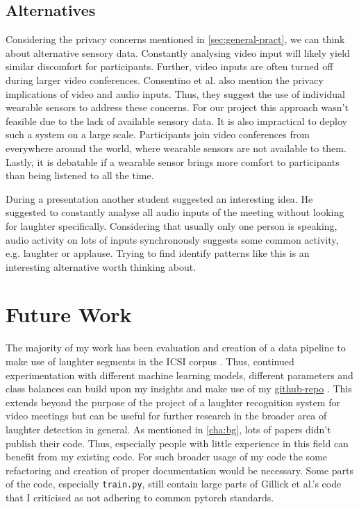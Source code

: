 \documentclass[bsc,frontabs,parskip,deptreport]{infthesis}
\newcommand{\coderepo}{\href{https://github.com/LasseWolter/laughter-detection-icsi}{github-repo} }
\begin{document}
\section{Alternatives}
Considering the privacy concerns mentioned in \autoref{sec:general-pract}, we can think about alternative sensory data. 
Constantly analysing video input will likely yield similar discomfort for participants. Further, video inputs are often turned off during larger video conferences.
Consentino et al. \citep{cosentino2016quantitative}  also mention the privacy implications of video and audio inputs.
Thus, they suggest the use of individual wearable sensors to address these concerns. For our project this approach wasn't feasible due to the lack of available sensory data.
It is also impractical to deploy such a system on a large scale. Participants join video conferences from everywhere around the world, where wearable sensors are not available to them. Lastly, it is debatable if a wearable sensor brings more comfort to participants than being listened to all the time. 

During a presentation another student suggested an interesting idea. He suggested to constantly analyse all audio inputs of the meeting without looking for laughter specifically. Considering that usually only one person is speaking, audio activity on lots of inputs synchronously suggests some common activity, e.g. laughter or applause. Trying to find identify patterns like this is an interesting alternative worth thinking about. 

\chapter{Future Work}
The majority of my work has been evaluation and creation of a data pipeline to make use of laughter segments in the ICSI corpus \citep{morgan2001meeting}. Thus, continued experimentation with different machine learning models, different parameters and class balances can build upon my insights and make use of my \coderepo.
This extends beyond the purpose of the project of a laughter recognition system for video meetings but can be useful for further research in the broader area of laughter detection in general. 
As mentioned in \autoref{cha:bg}, lots of papers didn't publish their code.
Thus, especially people with little experience in this field can benefit from my existing code. 
For such broader usage of my code the some refactoring and creation of proper documentation would be necessary.
Some parts of the code, especially \verb|train.py|, still contain large parts of Gillick et al.'s code that I criticised as not adhering to common pytorch standards. 
\end{document}
